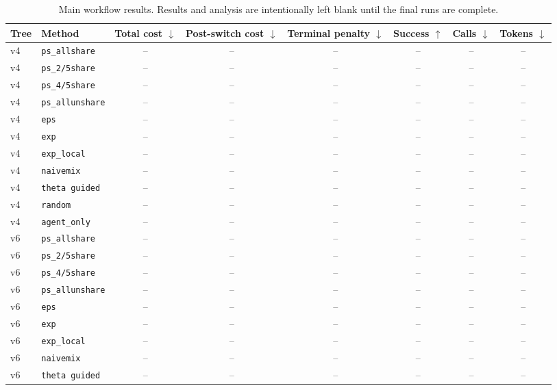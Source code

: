 \begin{table}[t]
    \centering
    \small
    \caption{Main workflow results. Results and analysis are intentionally left blank until the final runs are complete.}
    \label{tab:main_results}
    \begin{tabular}{llcccccc}
        \toprule
        Tree & Method & Total cost $\downarrow$ & Post-switch cost $\downarrow$ & Terminal penalty $\downarrow$ & Success $\uparrow$ & Calls $\downarrow$ & Tokens $\downarrow$ \\
        \midrule
        v4 & \texttt{ps\_allshare} & -- & -- & -- & -- & -- & -- \\
        v4 & \texttt{ps\_2/5share} & -- & -- & -- & -- & -- & -- \\
        v4 & \texttt{ps\_4/5share} & -- & -- & -- & -- & -- & -- \\
        v4 & \texttt{ps\_allunshare} & -- & -- & -- & -- & -- & -- \\
        v4 & \texttt{eps} & -- & -- & -- & -- & -- & -- \\
        v4 & \texttt{exp} & -- & -- & -- & -- & -- & -- \\
        v4 & \texttt{exp\_local} & -- & -- & -- & -- & -- & -- \\
        v4 & \texttt{naivemix} & -- & -- & -- & -- & -- & -- \\
        v4 & \texttt{theta guided} & -- & -- & -- & -- & -- & -- \\
        v4 & \texttt{random} & -- & -- & -- & -- & -- & -- \\
        v4 & \texttt{agent\_only} & -- & -- & -- & -- & -- & -- \\
        \midrule
        v6 & \texttt{ps\_allshare} & -- & -- & -- & -- & -- & -- \\
        v6 & \texttt{ps\_2/5share} & -- & -- & -- & -- & -- & -- \\
        v6 & \texttt{ps\_4/5share} & -- & -- & -- & -- & -- & -- \\
        v6 & \texttt{ps\_allunshare} & -- & -- & -- & -- & -- & -- \\
        v6 & \texttt{eps} & -- & -- & -- & -- & -- & -- \\
        v6 & \texttt{exp} & -- & -- & -- & -- & -- & -- \\
        v6 & \texttt{exp\_local} & -- & -- & -- & -- & -- & -- \\
        v6 & \texttt{naivemix} & -- & -- & -- & -- & -- & -- \\
        v6 & \texttt{theta guided} & -- & -- & -- & -- & -- & -- \\

\end{tabular}
\end{table}
